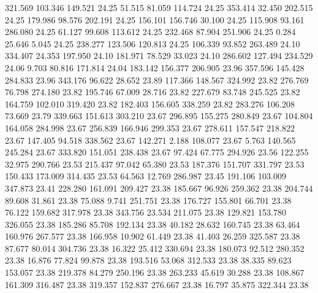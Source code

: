  321.569  103.346  149.521        24.25
  51.515   81.059  114.724        24.25
 353.414   32.450  202.515        24.25
 179.986   98.576  202.191        24.25
 156.101  156.746   30.100        24.25
 115.908   93.161  286.080        24.25
  61.127   99.608  113.612        24.25
 232.468   87.904  251.906        24.25
   0.284   25.646    5.045        24.25
 238.277  123.506  120.813        24.25
 106.339   93.852  263.489        24.10
 334.407   24.353  197.950        24.10
 181.971   78.529   33.023        24.10
 286.602  127.494  234.529        24.06
   9.703   80.816  171.814        24.04
 183.142  156.377  206.905        23.96
 357.596  145.428  284.833        23.96
 343.176   96.622   28.652        23.89
 117.366  148.567  324.992        23.82
 276.769   76.798  274.180        23.82
 195.746   67.009   28.716        23.82
 227.679   83.748  245.525        23.82
 164.759  102.010  319.420        23.82
 182.403  156.605  338.259        23.82
 283.276  106.208   73.669        23.79
 339.663  151.613  303.210        23.67
 296.895  155.275  280.849        23.67
 104.804  164.058  284.998        23.67
 256.839  166.946  299.353        23.67
 278.611  157.547  218.822        23.67
 147.405   94.518  338.562        23.67
 142.271    2.188  108.077        23.67
   5.763  140.565  245.284        23.67
 333.820  151.051  238.438        23.67
  97.424   67.775  294.926        23.56
 122.255   32.975  290.766        23.53
 215.437   97.042   65.380        23.53
 187.376  151.707  331.797        23.53
 150.433  173.009  314.435        23.53
  64.563   12.769  286.987        23.45
 191.106  103.009  347.873        23.41
 228.280  161.091  209.427        23.38
 185.667   96.926  259.362        23.38
 204.744   89.608   31.861        23.38
  75.088    9.741  251.751        23.38
 176.727  155.801   66.701        23.38
  76.122  159.682  317.978        23.38
 343.756   23.534  211.075        23.38
 129.821  153.780  326.055        23.38
 185.286   85.708  192.134        23.38
  40.182   28.632  160.745        23.38
  63.464  160.976  267.577        23.38
 166.958   10.902   61.449        23.38
  41.403   26.259  325.587        23.38
  87.677   80.014  304.736        23.38
  16.322   25.412  330.694        23.38
 180.073   92.512  280.352        23.38
  16.876   77.824   99.878        23.38
 193.516   53.068  312.533        23.38
  38.335   89.623  153.057        23.38
 219.378   84.279  250.196        23.38
 263.233   45.619   30.288        23.38
 108.867  161.309  316.487        23.38
 319.357  152.837  276.667        23.38
  16.797   35.875  322.344        23.38
